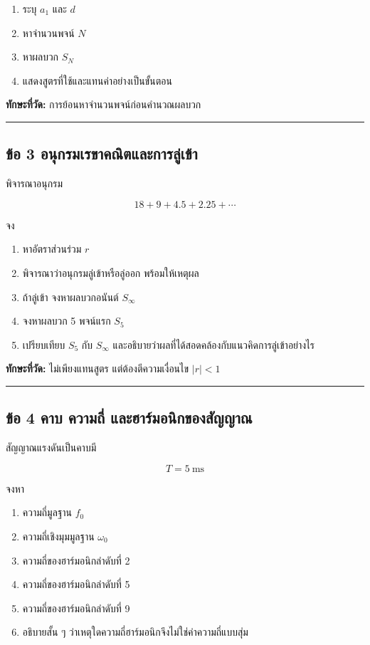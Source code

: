 \begin{enumerate}
    \item ระบุ \(a_1\) และ \(d\)
    \item หาจำนวนพจน์ \(N\)
    \item หาผลบวก \(S_N\)
    \item แสดงสูตรที่ใช้และแทนค่าอย่างเป็นขั้นตอน
\end{enumerate}

\textbf{ทักษะที่วัด:} การย้อนหาจำนวนพจน์ก่อนคำนวณผลบวก

\par\noindent\rule{\textwidth}{0.4pt}\par

\subsection{ข้อ 3 อนุกรมเรขาคณิตและการลู่เข้า}

พิจารณาอนุกรม

\[
18+9+4.5+2.25+\cdots
\]

จง

\begin{enumerate}
    \item หาอัตราส่วนร่วม \(r\)
    \item พิจารณาว่าอนุกรมลู่เข้าหรือลู่ออก พร้อมให้เหตุผล
    \item ถ้าลู่เข้า จงหาผลบวกอนันต์ \(S_\infty\)
    \item จงหาผลบวก 5 พจน์แรก \(S_5\)
    \item เปรียบเทียบ \(S_5\) กับ \(S_\infty\) และอธิบายว่าผลที่ได้สอดคล้องกับแนวคิดการลู่เข้าอย่างไร
\end{enumerate}

\textbf{ทักษะที่วัด:} ไม่เพียงแทนสูตร แต่ต้องตีความเงื่อนไข \(|r|<1\)

\par\noindent\rule{\textwidth}{0.4pt}\par

\subsection{ข้อ 4 คาบ ความถี่ และฮาร์มอนิกของสัญญาณ}

สัญญาณแรงดันเป็นคาบมี

\[
T=5\ \text{ms}
\]

จงหา

\begin{enumerate}
    \item ความถี่มูลฐาน \(f_0\)
    \item ความถี่เชิงมุมมูลฐาน \(\omega_0\)
    \item ความถี่ของฮาร์มอนิกลำดับที่ 2
    \item ความถี่ของฮาร์มอนิกลำดับที่ 5
    \item ความถี่ของฮาร์มอนิกลำดับที่ 9
    \item อธิบายสั้น ๆ ว่าเหตุใดความถี่ฮาร์มอนิกจึงไม่ใช่ค่าความถี่แบบสุ่ม
\end{enumerate}

